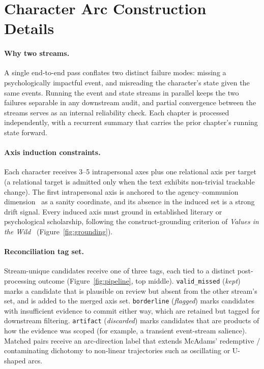 \documentclass[11pt]{article}
\begin{document}


\clearpage
\appendix

\section{Character Arc Construction Details\label{app:arc-details}}

\paragraph{Why two streams.}
A single end-to-end pass conflates two distinct failure modes: missing a psychologically impactful event, and misreading the character's state given the same events. Running the event and state streams in parallel keeps the two failures separable in any downstream audit, and partial convergence between the streams serves as an internal reliability check. Each chapter is processed independently, with a recurrent summary that carries the prior chapter's running state forward.

\paragraph{Axis induction constraints.}
Each character receives 3--5 intrapersonal axes plus one relational axis per target (a relational target is admitted only when the text exhibits non-trivial trackable change). The first intrapersonal axis is anchored to the agency--communion dimension~\cite{Mcadams1999, Mcadams2013} as a sanity coordinate, and its absence in the induced set is a strong drift signal. Every induced axis must ground in established literary or psychological scholarship, following the construct-grounding criterion of \emph{Values in the Wild}~\cite{huang2025values} (Figure~\ref{fig:grounding}).

\paragraph{Reconciliation tag set.}
Stream-unique candidates receive one of three tags, each tied to a distinct post-processing outcome (Figure~\ref{fig:pipeline}, top middle). \texttt{valid\_missed} (\emph{kept}) marks a candidate that is plausible on review but absent from the other stream's set, and is added to the merged axis set. \texttt{borderline} (\emph{flagged}) marks candidates with insufficient evidence to commit either way, which are retained but tagged for downstream filtering. \texttt{artifact} (\emph{discarded}) marks candidates that are products of how the evidence was scoped (for example, a transient event-stream salience). Matched pairs receive an arc-direction label that extends McAdams' redemptive / contaminating dichotomy to non-linear trajectories such as oscillating or U-shaped arcs.
\end{document}
